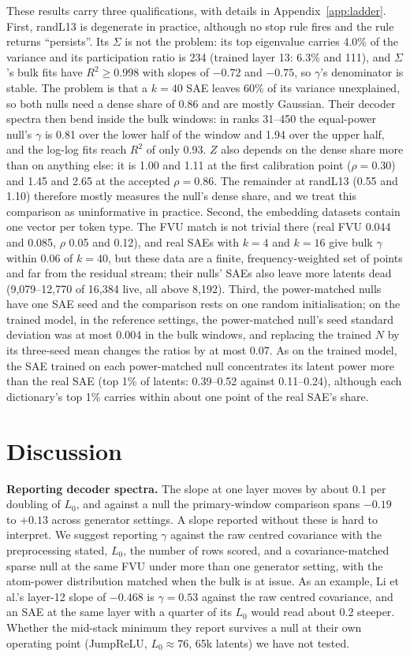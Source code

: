 \documentclass{article}
\newcommand{\Sig}{\Sigma}
\newcommand{\Lz}{L_0}
\begin{document}
These results carry three qualifications, with details in Appendix~\ref{app:ladder}. First, randL13 is degenerate in practice, although no stop rule fires and the rule returns ``persists''. Its $\Sig$ is not the problem: its top eigenvalue carries 4.0\% of the variance and its participation ratio is 234 (trained layer 13: 6.3\% and 111), and $\Sig$'s bulk fits have $R^2\ge 0.998$ with slopes of $-0.72$ and $-0.75$, so $\gamma$'s denominator is stable. The problem is that a $k=40$ SAE leaves 60\% of its variance unexplained, so both nulls need a dense share of 0.86 and are mostly Gaussian. Their decoder spectra then bend inside the bulk windows: in ranks 31--450 the equal-power null's $\gamma$ is 0.81 over the lower half of the window and 1.94 over the upper half, and the log-log fits reach $R^2$ of only 0.93. $Z$ also depends on the dense share more than on anything else: it is 1.00 and 1.11 at the first calibration point ($\rho=0.30$) and 1.45 and 2.65 at the accepted $\rho=0.86$. The remainder at randL13 (0.55 and 1.10) therefore mostly measures the null's dense share, and we treat this comparison as uninformative in practice. Second, the embedding datasets contain one vector per token type. The FVU match is not trivial there (real FVU 0.044 and 0.085, $\rho$ 0.05 and 0.12), and real SAEs with $k=4$ and $k=16$ give bulk $\gamma$ within 0.06 of $k=40$, but these data are a finite, frequency-weighted set of points and far from the residual stream; their nulls' SAEs also leave more latents dead (9,079--12,770 of 16,384 live, all above 8,192). Third, the power-matched nulls have one SAE seed and the comparison rests on one random initialisation; on the trained model, in the reference settings, the power-matched null's seed standard deviation was at most 0.004 in the bulk windows, and replacing the trained $N$ by its three-seed mean changes the ratios by at most 0.07. As on the trained model, the SAE trained on each power-matched null concentrates its latent power more than the real SAE (top 1\% of latents: 0.39--0.52 against 0.11--0.24), although each dictionary's top 1\% carries within about one point of the real SAE's share.

\section{Discussion}
\label{sec:disc}

\textbf{Reporting decoder spectra.} The slope at one layer moves by about 0.1 per doubling of $\Lz$, and against a null the primary-window comparison spans $-0.19$ to $+0.13$ across generator settings. A slope reported without these is hard to interpret. We suggest reporting $\gamma$ against the raw centred covariance with the preprocessing stated, $\Lz$, the number of rows scored, and a covariance-matched sparse null at the same FVU under more than one generator setting, with the atom-power distribution matched when the bulk is at issue. As an example, Li et al.'s layer-12 slope of $-0.468$ is $\gamma=0.53$ against the raw centred covariance, and an SAE at the same layer with a quarter of its $\Lz$ would read about 0.2 steeper. Whether the mid-stack minimum they report survives a null at their own operating point (JumpReLU, $\Lz\approx 76$, 65k latents) we have not tested.
\end{document}
